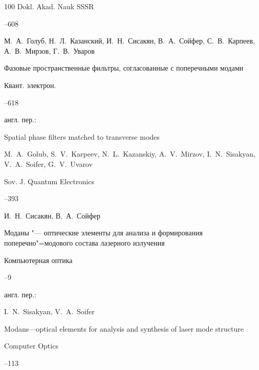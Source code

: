 \begin{thebibliography}{100}
\jour Dokl. Akad. Nauk SSSR 




--608




\by М.~А.~Голуб, Н.~Л.~Казанский, И.~Н.~Сисакян, В.~А.~Сойфер, С.~В.~Карпеев, А.~В.~Мирзов, Г.~В.~Уваров

\paper Фазовые пространственные фильтры, согласованные с поперечными модами 

\jour Квант. электрон.




--618

\transl англ. пер.:~

\paper Spatial phase filters matched to transverse modes

\by M.~A.~Golub, S.~V.~Karpeev, N.~L.~Kazanskiy, A.~V.~Mirzov, I.~N.~Sisakyan, V.~A.~Soifer, G.~V.~Uvarov

\jour Sov. J. Quantum Electronics




--393




\by И.~Н.~Сисакян, В.~А.~Сойфер

\paper Моданы "--- оптические элементы для анализа и формирования поперечно"=модового состава лазерного излучения

\jour Компьютерная оптика



--9

\transl англ. пер.:~

\by I.~N.~Sisakyan, V.~A.~Soifer

\paper Modans—optical elements for analysis and synthesis of  laser mode structure

\jour Computer Optics




--113








\end{thebibliography}
